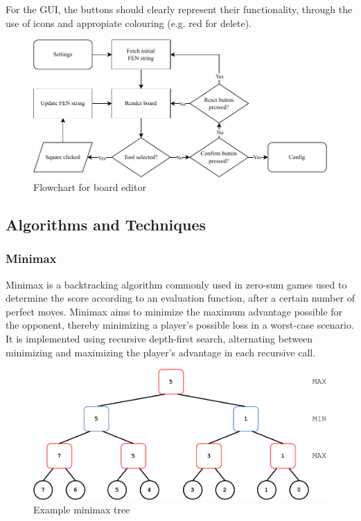 \documentclass[../main/main.tex]{subfiles}
\begin{document}
For the GUI, the buttons should clearly represent their functionality, through the use of icons and appropiate colouring (e.g. red for delete).

\begin{figure}[ht!]
    \centering
    \includegraphics[width=\columnwidth]{../design/assets/editor_flowchart.pdf}
    \caption{Flowchart for board editor}
    \label{fig:editor-flowchart}
\end{figure}

\subsection{Algorithms and Techniques}
\subsubsection{Minimax}
Minimax is a backtracking algorithm commonly used in zero-sum games used to determine the score according to an evaluation function, after a certain number of perfect moves. Minimax aims to minimize the maximum advantage possible for the opponent, thereby minimizing a player’s possible loss in a worst-case scenario. It is implemented using recursive depth-first search, alternating between minimizing and maximizing the player’s advantage in each recursive call.

\begin{figure}[ht!]
    \centering
    \includegraphics[width=\columnwidth]{../design/assets/minimax.pdf}
    \caption{Example minimax tree}
    \label{fig:minimax}
\end{figure}
\end{document}
